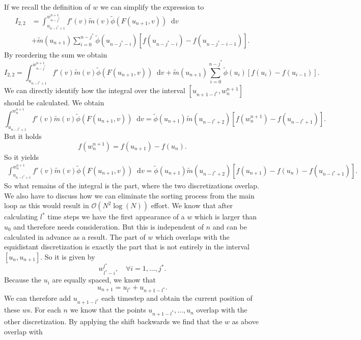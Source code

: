\documentclass[12pt,a4paper,twoside, open=right]{scrreprt}
\theoremstyle{definition}
\theoremstyle{plain}
\newcommand{\D}{\mathop{}\!\mathrm{d}}
\begin{document}
If we recall the definition of $w$ we can simplify the expression to
\begin{align}
I_{2,2}&=\int_{u_{n-l^*+1}}^{w^{n+1}_{n-j^*}}f'(v)\tilde{m}(v)\tilde{\phi}(F(u_{n+1},v))\D v \\&+\tilde{m}(u_{n+1})\sum_{i=0}^{n-j^*}\tilde\phi(u_{n-j^*-i})[f(u_{n-j^*-i})-f(u_{n-j^*-i-1})].
\end{align}
By reordering the sum we obtain
\begin{equation}
    I_{2,2}=\int_{u_{n-l^*+1}}^{w^{n+1}_{n-j^*}}f'(v)\tilde{m}(v)\tilde{\phi}(F(u_{n+1},v))\D v +
    \tilde{m}(u_{n+1})\sum_{i=0}^{n-j^*}\tilde\phi(u_{i})[f(u_i)-f(u_{i-1})].
\end{equation}
We can directly identify how the integral over the interval $[u_{n+1-l^*},w^{n+1}_{n}]$ should be calculated. We obtain 
\begin{equation}
    \int_{u_{n-l^*+1}}^{w^{n+1}_n}f'(v)\tilde{m}(v)\tilde{\phi}(F(u_{n+1},v))\D v = \tilde\phi(u_{n+1})\tilde{m}(u_{n-l^*+2})[f(w^{n+1}_n)-f(u_{n-l^*+1})].
\end{equation}
But it holds
\begin{equation}
    f(w^{n+1}_n)=f(u_{n+1})-f(u_n).
\end{equation}
So it yields
\begin{align}
     \int_{u_{n-l^*+1}}^{w^{n+1}_n}f'(v)\tilde{m}(v)\tilde{\phi}(F(u_{n+1},v))\D v = \tilde\phi(u_{n+1})\tilde{m}(u_{n-l^*+2})[f(u_{n+1})-f(u_n)-f(u_{n-l^*+1})].
\end{align}
So what remains of the integral is the part, where the two discretizations overlap. We also have to discuss how we can eliminate the sorting process from the main loop as this would result in $\mathcal{O}(N^2\log(N))$ effort. We know that after calculating $l^*$ time steps we have the first appearance of a $w$ which is larger than $u_0$ and therefore needs consideration. But this is independent of $n$ and can be calculated in advance as a result. The part of $w$ which overlaps with the equidistant discretization is exactly the part that is not entirely in the interval $[u_n,u_{n+1}]$. So it is given by
\begin{equation}
    w^{l^*}_{l^*-i},\quad\forall i=1,\dotsc,j^*.
\end{equation}
Because the $u_i$ are equally spaced, we know that
\begin{equation}
    u_{n+1}=u_{l^*}+u_{n+1-l^*}.
\end{equation}
We can therefore add $u_{n+1-l^*}$ each timestep and obtain the current position of these $w$s. For each $n$ we know that the points $u_{n+1-l^*},\dotsc,u_n$ overlap with the other discretization. By applying the shift backwards we find that the $w$ as above overlap with 
\end{document}
